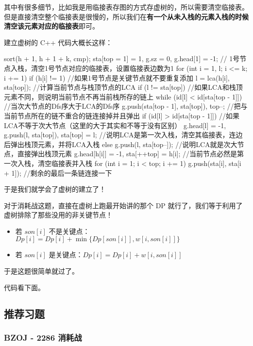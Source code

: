 {其中有很多细节，比如我是用临接表存图的方式存虚树的，所以需要清空临接表。但是直接清空整个临接表是很慢的，所以我们在\textbf{有一个从未入栈的元素入栈的时候清空该元素对应的临接表}即可。

建立虚树的 C++ 代码大概长这样：

\begin{cppcode}
sort(h + 1, h + 1 + k, cmp);
sta[top = 1] = 1, g.sz = 0, g.head[1] = -1;
// 1号节点入栈，清空1号节点对应的临接表，设置临接表边数为1
for (int i = 1, l; i <= k; i += 1)
  if (h[i] != 1)  //如果1号节点是关键节点就不要重复添加
  {
    l = lca(h[i], sta[top]);  //计算当前节点与栈顶节点的LCA
    if (l !=
        sta[top])  //如果LCA和栈顶元素不同，则说明当前节点不再当前栈所存的链上
    {
      while (id[l] < id[sta[top - 1]])  //当次大节点的Dfs序大于LCA的Dfs序
        g.push(sta[top - 1], sta[top]),
            top--;  //把与当前节点所在的链不重合的链连接掉并且弹出
      if (id[l] >
          id[sta[top -
                 1]])  //如果LCA不等于次大节点（这里的大于其实和不等于没有区别）
        g.head[l] = -1, g.push(l, sta[top]), sta[top] = l;
      //说明LCA是第一次入栈，清空其临接表，连边后弹出栈顶元素，并将LCA入栈
      else
        g.push(l, sta[top--]);  //说明LCA就是次大节点，直接弹出栈顶元素
    }
    g.head[h[i]] = -1,
    sta[++top] = h[i];  //当前节点必然是第一次入栈，清空临接表并入栈
  }
for (int i = 1; i < top; i += 1)
  g.push(sta[i], sta[i + 1]);  //剩余的最后一条链连接一下
\end{cppcode}

于是我们就学会了虚树的建立了！

对于消耗战这题，直接在虚树上跑最开始讲的那个 DP 就行了，我们等于利用了虚树排除了那些没用的非关键节点！

\begin{itemize}
\item 若 $son[i]$ 不是关键点：$Dp[i]=Dp[i] + \min \{Dp[son[i]],w[i,son[i]]\}$
\item 若 $son[i]$ 是关键点：$Dp[i]=Dp[i] + w[i,son[i]]$
\end{itemize}

于是这题很简单就过了。

代码看下面。

\subsection{推荐习题}

\subsubsection{BZOJ - 2286 消耗战}

}
